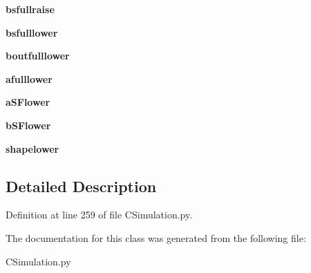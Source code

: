 \begin{DoxyCompactItemize}
\mbox{\label{class_c_simulation_1_1_simulation_1_1_no_m_a_s_s_models_1_1_shades_1_1_shade_a9a26ff9362f83e91d67d1392812b89a8}} 
{\bfseries bsfullraise}
\item 
\mbox{\label{class_c_simulation_1_1_simulation_1_1_no_m_a_s_s_models_1_1_shades_1_1_shade_a0dab9492a1910f3dbef1e0ac57954ef9}} 
{\bfseries bsfulllower}
\item 
\mbox{\label{class_c_simulation_1_1_simulation_1_1_no_m_a_s_s_models_1_1_shades_1_1_shade_a4bd43c964c14d7d83698718a3fd97407}} 
{\bfseries boutfulllower}
\item 
\mbox{\label{class_c_simulation_1_1_simulation_1_1_no_m_a_s_s_models_1_1_shades_1_1_shade_a03dbfc34573e6d7095a9b4c93e15f2d7}} 
{\bfseries afulllower}
\item 
\mbox{\label{class_c_simulation_1_1_simulation_1_1_no_m_a_s_s_models_1_1_shades_1_1_shade_a756f7dc07777dfdc9fd82deca77c1966}} 
{\bfseries a\+S\+Flower}
\item 
\mbox{\label{class_c_simulation_1_1_simulation_1_1_no_m_a_s_s_models_1_1_shades_1_1_shade_a69a0472d1f1e0525e4b1a814ac547a45}} 
{\bfseries b\+S\+Flower}
\item 
\mbox{\label{class_c_simulation_1_1_simulation_1_1_no_m_a_s_s_models_1_1_shades_1_1_shade_af31bbc2a713476c8520b2af9e1423112}} 
{\bfseries shapelower}
\end{DoxyCompactItemize}


\subsection{Detailed Description}


Definition at line 259 of file C\+Simulation.\+py.



The documentation for this class was generated from the following file\+:\begin{DoxyCompactItemize}
\item 
C\+Simulation.\+py\end{DoxyCompactItemize}
